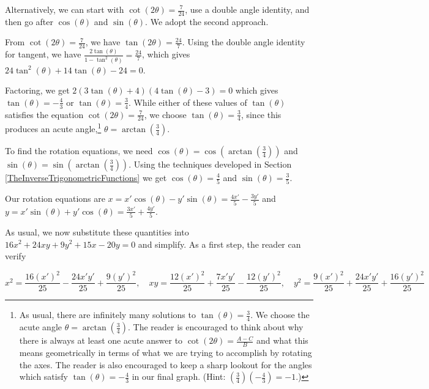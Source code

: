 \documentclass{ximera}
\begin{document}
\begin{example}
\begin{explanation}
\begin{enumerate}
 

Alternatively, we can start with $\cot(2\theta) = \frac{7}{24}$, use a double angle identity, and then go after $\cos(\theta)$ and $\sin(\theta)$.  We adopt the second approach. 

 

From $\cot(2\theta) = \frac{7}{24}$, we have $\tan(2\theta) = \frac{24}{7}$.  Using the double angle identity for tangent, we have $\frac{2\tan(\theta)}{1-\tan^{2}(\theta)} = \frac{24}{7}$, which gives $24 \tan^{2}(\theta) + 14 \tan(\theta) - 24=0$.  

 

Factoring, we get $2(3\tan(\theta)+4)(4\tan(\theta)-3) = 0$ which gives $\tan(\theta) = -\frac{4}{3}$ or $\tan(\theta) = \frac{3}{4}$.  While either of these values of $\tan(\theta)$ satisfies the equation $\cot(2\theta) = \frac{7}{24}$, we choose $\tan(\theta) = \frac{3}{4}$, since this produces an acute angle,\footnote{As usual, there are infinitely many solutions to $\tan(\theta) = \frac{3}{4}$.  We choose the acute angle  $\theta=\arctan\left(\frac{3}{4}\right)$. The reader is encouraged to think about why there is always at least one acute answer to $\cot(2\theta) = \frac{A-C}{B}$ and what this means geometrically in terms of what we are trying to accomplish by rotating the axes.  The reader is also encouraged to keep a sharp lookout for the angles which satisfy $\tan(\theta) = -\frac{4}{3}$ in our final graph.  (Hint:  $\left(\frac{3}{4}\right) \left(-\frac{4}{3}\right) = -1$.)}  $\theta = \arctan\left(\frac{3}{4}\right)$.  

 

To find the rotation equations, we need $\cos(\theta) = \cos\left(\arctan\left(\frac{3}{4}\right)\right)$ and $\sin(\theta) = \sin\left(\arctan\left(\frac{3}{4}\right)\right)$. Using the techniques developed in Section \ref{TheInverseTrigonometricFunctions} we get $\cos(\theta) = \frac{4}{5}$ and $\sin(\theta) = \frac{3}{5}$. 

 

Our rotation equations are $x = x' \cos(\theta) - y' \sin(\theta) = \frac{4x'}{5} - \frac{3y'}{5}$ and $y = x' \sin(\theta) + y'\cos(\theta) = \frac{3x'}{5} + \frac{4y'}{5}$. 

 

 As usual, we now substitute these quantities into $16x^2+24xy+9y^2 +15x-20y = 0$ and simplify.  As a first step, the reader can verify


\[ x^2 = \frac{16(x')^2}{25} - \frac{24 x'y'}{25} +\frac{9(y')^2}{25}, \quad xy = \frac{12(x')^2}{25} +\frac{7 x'y'}{25} - \frac{12(y')^2}{25}, \quad y^2 = \frac{9(x')^2}{25} + \frac{24x'y'}{25} +\frac{16(y')^2}{25} \]


\end{enumerate}
\end{explanation}
\end{example}
\end{document}
